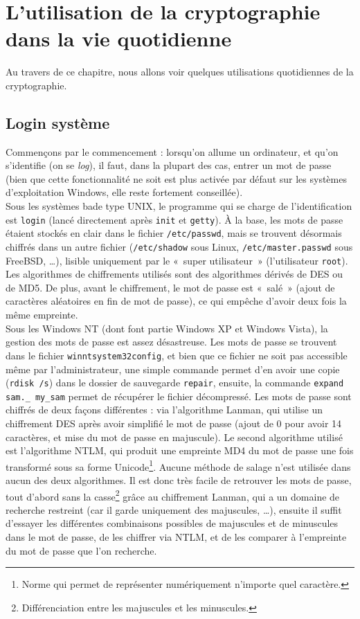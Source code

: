 \section{L'utilisation de la cryptographie dans la vie quotidienne}
Au travers de ce chapitre, nous allons voir quelques utilisations
quotidiennes de la cryptographie.
 
\subsection{Login système}
Commençons par le commencement : lorsqu'on allume un ordinateur,
et qu'on s'identifie (on se \emph{log}), il faut, dans la plupart 
des cas, entrer un mot de passe (bien que cette fonctionnalité
ne soit est plus activée par défaut sur les systèmes d'exploitation
Windows, elle reste fortement conseillée).
\\
 
Sous les systèmes bade type UNIX, le programme qui se charge de
l'identification est \texttt{login} (lancé directement après
\texttt{init} et \texttt{getty}). À la base, les mots de passe
étaient stockés en clair dans le fichier \texttt{/etc/passwd},
mais se trouvent désormais chiffrés dans un autre
fichier (\texttt{/etc/shadow} sous Linux,
\texttt{/etc/master.passwd} sous FreeBSD, …), 
lisible uniquement par le «~super utilisateur~»
(l'utilisateur \texttt{root}).
Les algorithmes de chiffrements
utilisés sont des algorithmes dérivés de DES ou de MD5.
 De plus, avant le chiffrement, le mot
de passe est «~salé~» (ajout de caractères aléatoires en fin de
mot de passe), ce qui empêche d'avoir
deux fois la même empreinte.
\\
 
Sous les Windows NT (dont font partie Windows XP et Windows
Vista), la gestion des mots de passe est assez désastreuse. Les
mots de passe se trouvent dans le fichier
\texttt{\bslash winnt\bslash system32\bslash config}, et bien
que ce fichier ne soit pas
accessible même par l'administrateur, une simple commande permet
d'en avoir une copie (\texttt{rdisk /s}) dans le dossier de
sauvegarde \texttt{repair}, ensuite, la commande \texttt{expand
sam.\_ my\_sam}
permet de récupérer le fichier décompressé.
Les mots de passe sont chiffrés de deux façons différentes : via
l'algorithme Lanman, qui utilise un chiffrement DES après avoir
simplifié le mot de passe (ajout de 0 pour avoir 14 caractères, et
mise du mot de passe en majuscule).
Le second algorithme utilisé est l'algorithme NTLM, qui produit
une empreinte MD4 du mot de passe une fois transformé sous sa
forme Unicode\footnote{Norme qui permet de représenter
numériquement n'importe quel caractère.}.
 Aucune méthode de salage n'est utilisée dans aucun
des deux algorithmes. Il est donc très facile de retrouver les
mots de passe, tout d'abord sans la casse\footnote{Différenciation
entre les majuscules et les minuscules.} grâce au chiffrement
Lanman, qui a un domaine de recherche restreint (car il garde 
uniquement des
majuscules, …), ensuite il suffit d'essayer les différentes
combinaisons possibles de majuscules et de minuscules dans le mot
de passe, de les chiffrer via NTLM, et de les comparer à
l'empreinte du mot de passe que l'on recherche. 
\\
 
